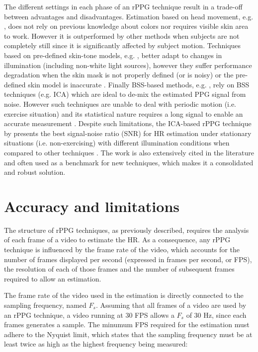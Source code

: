 The different settings in each phase of an rPPG technique result in a trade-off between advantages and disadvantages. Estimation based on head movement, e.g. \textcite{6619284}, does not rely on previous knowledge about colors nor requires visible skin area to work. However it is outperformed by other methods when subjects are not completely still \parencite{li2014remote} since it is significantly affected by subject motion. Techniques based on pre-defined skin-tone models, e.g. \textcite{Wang_2016novel,de_Haan_2013}, better adapt to changes in illumination (including non-white light sources), however they suffer performance degradation when the skin mask is not properly defined (or is noisy) or the pre-defined skin model is inaccurate \parencite{Wang_2016algorithmic}. Finally BSS-based methods, e.g. \textcite{poh2011advancements}, rely on BSS techniques (e.g. ICA) which are ideal to de-mix the estimated PPG signal from noise. However such techniques are unable to deal with periodic motion (i.e. exercise situation) and its statistical nature requires a long signal to enable an accurate measurement \parencite{Wang_2016algorithmic}. Despite such limitations, the ICA-based rPPG technique by \textcite{poh2011advancements} presents the best signal-noise ratio (SNR) for HR estimation under stationary situations (i.e. non-exercising) with different illumination conditions when compared to other techniques \parencite{Wang_2016novel}. The work is also extensively cited in the literature and often used as a benchmark for new techniques, which makes it a consolidated and robust solution.

\section{Accuracy and limitations}

The structure of rPPG techniques, as previously described, requires the analysis of each frame of a video to estimate the HR. As a consequence, any rPPG technique is influenced by the frame rate of the video, which accounts for the number of frames displayed per second (expressed in frames per second, or FPS), the resolution of each of those frames and the number of subsequent frames required to allow an estimation.

The frame rate of the video used in the estimation is directly connected to the sampling frequency, named $F_s$. Assuming that all frames of a video are used by an rPPG technique, a video running at 30 FPS allows a $F_s$ of 30 Hz, since each frames generates a sample. The minumum FPS required for the estimation must adhere to the Nyquist limit, which states that the sampling frequency must be at least twice as high as the highest frequency being measured:


